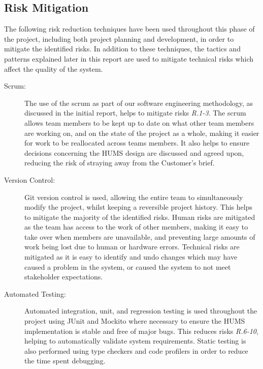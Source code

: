 \documentclass[10pt,a4paper]{article}
\begin{document}
\subsection{Risk Mitigation}
The following risk reduction techniques have been used throughout this phase of the project, including both project planning and development, in order to mitigate the identified risks. In addition to these techniques, the tactics and patterns explained later in this report are used to mitigate technical risks which affect the quality of the system.
\begin{description}
\item[Scrum:]
The use of the scrum as part of our software engineering methodology, as discussed in the initial report, helps to mitigate risks \emph{R.1-3}. The scrum allows team members to be kept up to date on what other team members are working on, and on the state of the project as a whole, making it easier for work to be reallocated across teams members. It also helps to ensure decisions concerning the HUMS design are discussed and agreed upon, reducing the risk of straying away from the Customer's brief.

\item[Version Control:]
Git version control is used, allowing the entire team to simultaneously modify the project, whilst keeping a reversible project history. This helps to mitigate the majority of the identified risks. Human risks are mitigated as the team has access to the work of other members, making it easy to take over when members are unavailable, and preventing large amounts of work being lost due to human or hardware errors. Technical risks are mitigated as it is easy to identify and undo changes which may have caused a problem in the system, or caused the system to not meet stakeholder expectations.

\item[Automated Testing:] 
Automated integration, unit, and regression testing is used throughout the project using JUnit and Mockito where necessary to ensure the HUMS implementation is stable and free of major bugs. This reduces risks \emph{R.6-10}, helping to automatically validate system requirements. 
Static testing is also performed using type checkers and code profilers in order to reduce the time spent debugging.
\end{description}

\end{document}
